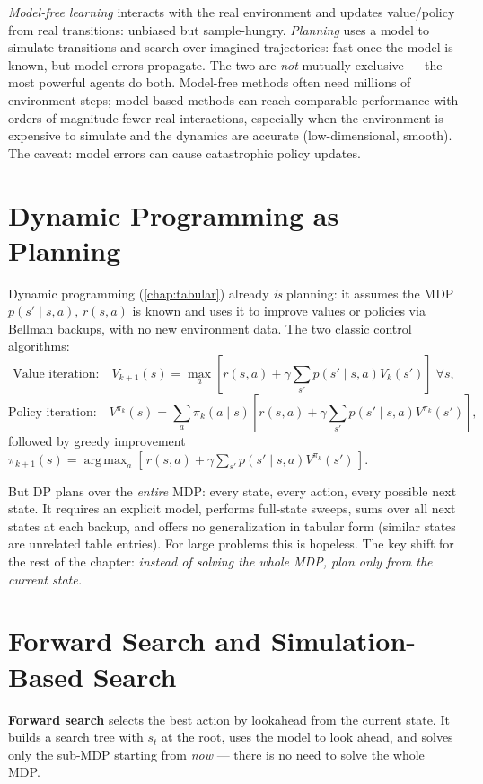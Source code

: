 \documentclass[11pt, oneside]{book}
\newcommand{\argmax}{\operatorname*{arg\,max}}
\begin{document}
\emph{Model-free learning} interacts with the real environment and updates value/policy
from real transitions: unbiased but sample-hungry. \emph{Planning} uses a model to
simulate transitions and search over imagined trajectories: fast once the model is known,
but model errors propagate. The two are \emph{not} mutually exclusive --- the most powerful
agents do both. Model-free methods often need millions of environment steps; model-based
methods can reach comparable performance with orders of magnitude fewer real interactions,
especially when the environment is expensive to simulate and the dynamics are accurate
(low-dimensional, smooth). The caveat: model errors can cause catastrophic policy updates.

\section{Dynamic Programming as Planning}

Dynamic programming (\cref{chap:tabular}) already \emph{is} planning: it assumes the MDP
$p(s'\mid s,a),\, r(s,a)$ is known and uses it to improve values or policies via Bellman
backups, with no new environment data. The two classic control algorithms:
\[
  \text{Value iteration:}\quad
  V_{k+1}(s) = \max_a\!\left[r(s,a) + \gamma \sum_{s'} p(s'\mid s,a) V_k(s')\right] \;\forall s,
\]
\[
  \text{Policy iteration:}\quad
  V^{\pi_k}(s) = \sum_a \pi_k(a\mid s)\!\left[r(s,a) + \gamma\sum_{s'} p(s'\mid s,a) V^{\pi_k}(s')\right],
\]
followed by greedy improvement $\pi_{k+1}(s) = \argmax_a[\,r(s,a) + \gamma\sum_{s'}p(s'\mid s,a)V^{\pi_k}(s')\,]$.

But DP plans over the \emph{entire} MDP: every state, every action, every possible next
state. It requires an explicit model, performs full-state sweeps, sums over all next
states at each backup, and offers no generalization in tabular form (similar states are
unrelated table entries). For large problems this is hopeless. The key shift for the rest
of the chapter: \emph{instead of solving the whole MDP, plan only from the current state.}

\section{Forward Search and Simulation-Based Search}

\textbf{Forward search} selects the best action by lookahead from the current state. It
builds a search tree with $s_t$ at the root, uses the model to look ahead, and solves only
the sub-MDP starting from \emph{now} --- there is no need to solve the whole MDP.
\end{document}
